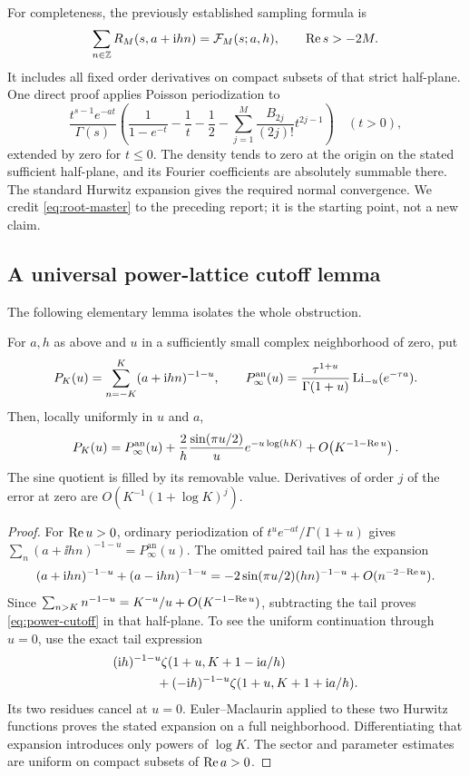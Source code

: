 For completeness, the previously established sampling formula is
\begin{equation}\label{eq:root-master}
 \sum_{n\in\mathbb Z}R_M(s,a+\mathrm i hn)={\cal F}_M(s;a,h),
 \qquad \operatorname{Re} s>-2M.
\end{equation}
It includes all fixed order derivatives on compact subsets of that
strict half-plane. One direct proof applies Poisson periodization to
\[
 \frac{t^{s-1}e^{-at}}{\Gamma(s)}
 \left(\frac1{1-e^{-t}}-\frac1t-\frac12
       -\sum_{j=1}^{M}\frac{B_{2j}}{(2j)!}t^{2j-1}\right)
 \quad(t>0),
\]
extended by zero for \(t\leq0\). The density tends to zero at the
origin on the stated sufficient half-plane, and its
Fourier coefficients are absolutely summable there. The standard
Hurwitz expansion \cite[Section 25.11]{DLMF} gives the required
normal convergence. We credit \eqref{eq:root-master} to the preceding
report; it is the starting point, not a new claim.

\subsection{A universal power-lattice cutoff lemma}

The following elementary lemma isolates the whole obstruction.

\begin{lemma}\label{lem:power-cutoff}
For \(a,h\) as above and \(u\) in a sufficiently small complex
neighborhood of zero, put
\[
 P_K(u)=\sum_{n=-K}^{K}(a+\mathrm i hn)^{-1-u},\qquad
 P_\infty^{\mathrm{an}}(u)=
       \frac{\tau^{1+u}}{\Gamma(1+u)}\operatorname{Li}_{-u}(e^{-\tau a}).
\]
Then, locally uniformly in \(u\) and \(a\),
\begin{equation}\label{eq:power-cutoff}
 P_K(u)=P_\infty^{\mathrm{an}}(u)
    +\frac{2}{h}\frac{\sin(\pi u/2)}{u}
                   e^{-u\log(hK)}
    +O\!\left(K^{-1-\operatorname{Re} u}\right).
\end{equation}
The sine quotient is filled by its removable value. Derivatives of
order \(j\) of the error at zero are
\(O(K^{-1}(1+\log K)^j)\).
\end{lemma}

\begin{proof}
For \(\operatorname{Re} u>0\), ordinary periodization of
\(t^u e^{-at}/\Gamma(1+u)\) gives
\(\sum_n(a+\ii hn)^{-1-u}=P_\infty^{\mathrm{an}}(u)\).
The omitted paired tail has the expansion
\[
 (a+\mathrm i hn)^{-1-u}+(a-\mathrm i hn)^{-1-u}
 =-2\sin(\pi u/2)(hn)^{-1-u}+O(n^{-2-\operatorname{Re} u}).
\]
Since
\(\sum_{n>K}n^{-1-u}=K^{-u}/u+O(K^{-1-\operatorname{Re} u})\),
subtracting the tail proves \eqref{eq:power-cutoff} in that half-plane.
To see the uniform continuation through \(u=0\), use the exact tail
expression
\begin{align*}
 &( \ii h)^{-1-u}\zeta(1+u,K+1-\ii a/h)\\
 &\hspace{12mm}
 +(-\ii h)^{-1-u}\zeta(1+u,K+1+\ii a/h).
\end{align*}
Its two residues cancel at \(u=0\). Euler--Maclaurin applied to
these two Hurwitz functions proves the stated expansion on a full
neighborhood. Differentiating that expansion introduces only powers
of \(\log K\). The sector and parameter estimates are uniform on
compact subsets of \(\operatorname{Re} a>0\).
\end{proof}

